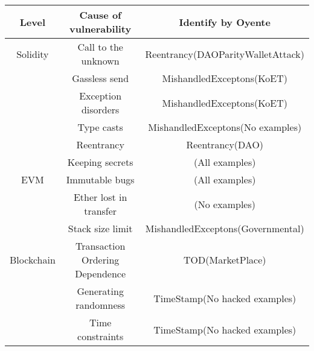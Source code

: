 \documentclass{llncs}
\begin{document}
\begin{center}
\begin{tabular}{|c|c|c|}
\hline
\textbf{Level}	&\textbf{Cause of vulnerability}	&\textbf{Identify by Oyente}\\	\hline
Solidity	&Call to the unknown		&Reentrancy(DAOParityWalletAttack)		\\	\hline
\			&Gassless send				&MishandledExceptons(KoET)		\\	\hline
\			&Exception disorders		&MishandledExceptons(KoET)		\\	\hline
\			&Type casts					&MishandledExceptons(No examples)		\\	\hline
\			&Reentrancy					&Reentrancy(DAO)		\\	\hline
\			&Keeping secrets			&(All examples)		\\	\hline
EVM			&Immutable bugs				&(All examples)		\\	\hline
\			&Ether lost in transfer		&(No examples)		\\	\hline
\			&Stack size limit			&MishandledExceptons(Governmental)		\\	\hline
Blockchain	&Transaction Ordering Dependence	&TOD(MarketPlace)	\\	\hline
\			&Generating randomness		&TimeStamp(No hacked examples)		\\	\hline
\			&Time constraints			&TimeStamp(No hacked examples)		\\	\hline

\end{tabular}
\end{center}
\end{document}
